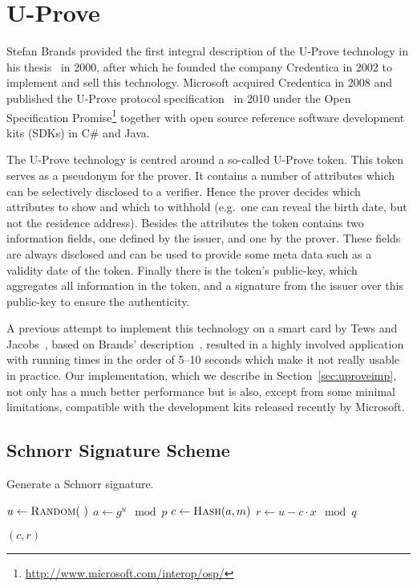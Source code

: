 \chapter{U-Prove}

Stefan Brands provided the first integral description of the U-Prove
technology in his thesis~\cite{Brands2000} in 2000, after which he founded
the company Credentica in 2002 to implement and sell this technology.
Microsoft acquired Credentica in 2008 and published the U-Prove protocol
specification~\cite{U-Prove_Crypto2010} in 2010 under the Open
Specification
Promise\footnote{\url{http://www.microsoft.com/interop/osp/}} together with
open source reference software development kits (SDKs) in C\# and Java.

The U-Prove technology is centred around a so-called U-Prove token. This
token serves as a pseudonym for the prover. It contains a number of
attributes which can be selectively disclosed to a verifier. Hence the
prover decides which attributes to show and which to withhold (e.g.\ one
can reveal the birth date, but not the residence address). Besides the
attributes the token contains two information fields, one defined by the
issuer, and one by the prover. These fields are always disclosed and can be
used to provide some meta data such as a validity date of the token.
Finally there is the token's public-key, which aggregates all information
in the token, and a signature from the issuer over this public-key to
ensure the authenticity.

A previous attempt to implement this technology on a smart card by Tews and
Jacobs~\cite{TewsJacobs09}, based on Brands' description~\cite{Brands2000},
resulted in a highly involved application with running times in the order
of 5--10 seconds which make it not really usable in practice. Our
implementation, which we describe in Section~\ref{sec:uproveimp}, not only
has a much better performance but is also, except from some minimal
limitations, compatible with the development kits released recently by
Microsoft.

\section{Schnorr Signature Scheme}

\cite{Schnorr1989}

\begin{algorithm}
  \caption{Generate a Schnorr signature.}
  \label{alg:Schnorr-sign}
  \addtolength{\baselineskip}{1mm}
  \begin{algorithmic}[1]
      \State $u \gets \Call{Random}{~}$
      \State $a \gets g^u \mod p$
      \State $c \gets \Call{Hash}{a, m}$
      \State $r \gets u - c \cdot x \mod q$

      \Return $(c, r)$
    \EndFunction
  \end{algorithmic}
\end{algorithm}

